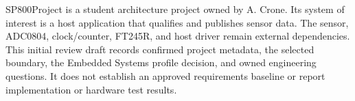 SP800Project is a student architecture project owned by A. Crone. Its system of
interest is a host application that qualifies and publishes sensor data.
The sensor, ADC0804, clock/counter, FT245R, and host driver remain external
dependencies. This initial review draft records confirmed project metadata,
the selected boundary, the Embedded Systems profile decision, and owned
engineering questions. It does not establish an approved requirements
baseline or report implementation or hardware test results.
